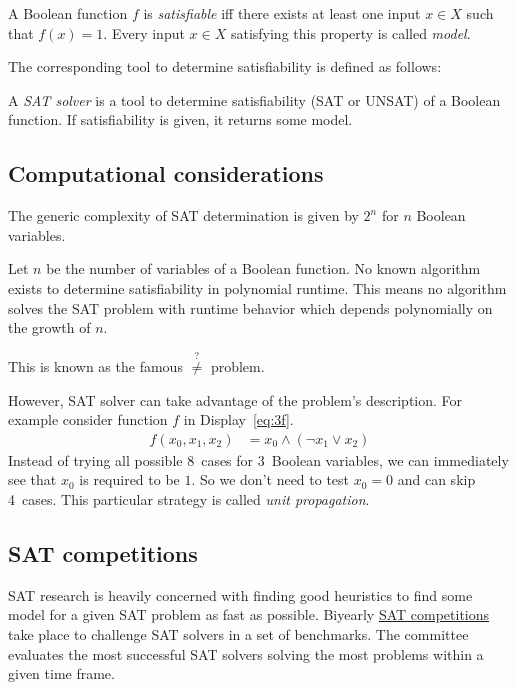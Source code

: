 \begin{defi}
  A Boolean function $f$ is \emph{satisfiable} iff there exists at least one
  input $x \in X$ such that $f(x) = 1$.
  Every input $x \in X$ satisfying this property is called \emph{model}.
\end{defi}

The corresponding tool to determine satisfiability is defined as follows:

\begin{defi}
  A \emph{SAT solver} is a tool to determine satisfiability (SAT or UNSAT)
  of a Boolean function. If satisfiability is given, it returns some model.
\end{defi}

\subsection{Computational considerations}
\label{sec:sat-complexity}
%
The generic complexity of SAT determination is given by $2^n$ for $n$ Boolean variables.

Let $n$ be the number of variables of a Boolean function.
No known algorithm exists to determine satisfiability in polynomial runtime.
This means no algorithm solves the SAT problem with runtime behavior
which depends polynomially on the growth of $n$.

This is known as the famous {\cP $\overset{?}{\neq}$ \cNP} problem.

However, SAT solver can take advantage of the problem's description.
For example consider function $f$ in Display~\ref{eq:3f}.
\begin{align} f(x_0, x_1, x_2) &= x_0 \land (\neg x_1 \lor x_2) \label{eq:3f} \end{align}
Instead of trying all possible 8~cases for 3~Boolean variables,
we can immediately see that $x_0$ is required to be $1$.
So we don't need to test $x_0 = 0$ and can skip 4~cases.
This particular strategy is called \emph{unit propagation}.

\subsection{SAT competitions}
\label{sec:sat-competitions}
%
SAT research is heavily concerned with finding good heuristics to find some model
for a given SAT problem as fast as possible. Biyearly
\href{http://satcompetition.org/}{SAT competitions} take place to challenge
SAT solvers in a set of benchmarks. The committee evaluates the most successful
SAT solvers solving the most problems within a given time frame.

